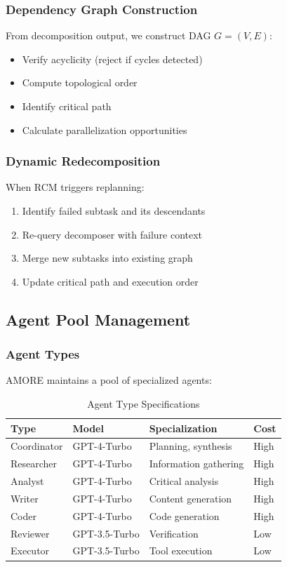 \documentclass{article}
\theoremstyle{plain}
\theoremstyle{definition}
\theoremstyle{remark}
\begin{document}
\subsubsection{Dependency Graph Construction}

From decomposition output, we construct DAG $G = (V, E)$:
\begin{itemize}
	\item Verify acyclicity (reject if cycles detected)
	\item Compute topological order
	\item Identify critical path
	\item Calculate parallelization opportunities
\end{itemize}

\subsubsection{Dynamic Redecomposition}

When RCM triggers replanning:
\begin{enumerate}
	\item Identify failed subtask and its descendants
	\item Re-query decomposer with failure context
	\item Merge new subtasks into existing graph
	\item Update critical path and execution order
\end{enumerate}

\subsection{Agent Pool Management}
\label{sec:agents}

\subsubsection{Agent Types}

AMORE maintains a pool of specialized agents:

\begin{table}[H]
	\centering
	\caption{Agent Type Specifications}
	\small
	\begin{tabular}{@{}llll@{}}
		\toprule
		\textbf{Type} & \textbf{Model} & \textbf{Specialization} & \textbf{Cost} \\
		\midrule
		Coordinator & GPT-4-Turbo & Planning, synthesis & High \\
		Researcher & GPT-4-Turbo & Information gathering & High \\
		Analyst & GPT-4-Turbo & Critical analysis & High \\
		Writer & GPT-4-Turbo & Content generation & High \\
		Coder & GPT-4-Turbo & Code generation & High \\
		Reviewer & GPT-3.5-Turbo & Verification & Low \\
		Executor & GPT-3.5-Turbo & Tool execution & Low \\
		\bottomrule
	\end{tabular}
\end{table}
\end{document}
